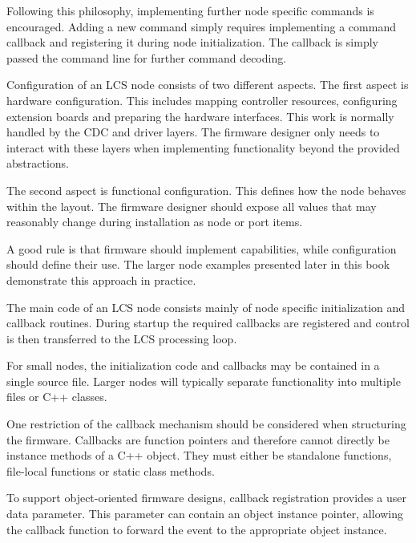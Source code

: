 Following this philosophy, implementing further node specific commands is 
encouraged. Adding a new command simply requires implementing a command 
callback and registering it during node initialization. The callback is 
simply passed the command line for further command decoding.


Configuration of an LCS node consists of two different aspects.
The first aspect is hardware configuration. This includes mapping controller
resources, configuring extension boards and preparing the hardware interfaces.
This work is normally handled by the CDC and driver layers. The firmware designer
only needs to interact with these layers when implementing functionality beyond
the provided abstractions.

The second aspect is functional configuration. This defines how the node behaves
within the layout. The firmware designer should expose all values that may
reasonably change during installation as node or port items.

A good rule is that firmware should implement capabilities, while configuration
should define their use.
The larger node examples presented later in this book demonstrate this approach
in practice.


The main code of an LCS node consists mainly of node specific initialization and
callback routines. During startup the required callbacks are registered and
control is then transferred to the LCS processing loop.

For small nodes, the initialization code and callbacks may be contained in a
single source file. Larger nodes will typically separate functionality into
multiple files or C++ classes.

One restriction of the callback mechanism should be considered when structuring
the firmware. Callbacks are function pointers and therefore cannot directly be
instance methods of a C++ object. They must either be standalone functions,
file-local functions or static class methods.

To support object-oriented firmware designs, callback registration provides a
user data parameter. This parameter can contain an object instance pointer,
allowing the callback function to forward the event to the appropriate object
instance.

